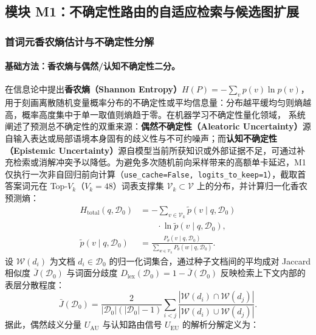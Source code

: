 \documentclass[11pt]{article}
\begin{document}
\subsection{模块 M1：不确定性路由的自适应检索与候选图扩展}

\subsubsection{首词元香农熵估计与不确定性分解}
\paragraph{基础方法：香农熵与偶然/认知不确定性二分。}
\citet{shannon1948mathematical} 在信息论中提出\textbf{香农熵（Shannon Entropy）}$H(P) = -\sum_v p(v)\ln p(v)$，用于刻画离散随机变量概率分布的不确定性或平均信息量：分布越平缓均匀则熵越高，概率高度集中于单一取值则熵趋于零。在机器学习不确定性量化领域，\citet{hullermeier2021aleatoric} 系统阐述了预测总不确定性的双重来源：\textbf{偶然不确定性（Aleatoric Uncertainty）}源自输入表达或局部语境本身固有的歧义性与不可约噪声；而\textbf{认知不确定性（Epistemic Uncertainty）}源自模型当前所获知识或外部证据不足，可通过补充检索或消解冲突予以降低。为避免多次随机前向采样带来的高额单卡延迟，M1 仅执行一次非自回归前向计算（\texttt{use\_cache=False, logits\_to\_keep=1}），截取首答案词元在 Top-$V_k$（$V_k = 48$）词表支撑集 $\mathcal{V}_k \subset \mathcal{V}$ 上的分布，并计算归一化香农预测熵：
\begin{align}
H_{\text{total}}(q, \mathcal{D}_0) &= -\sum_{v \in \mathcal{V}_k} \tilde{p}(v \mid q, \mathcal{D}_0) \nonumber \\
&\qquad \cdot \ln \tilde{p}(v \mid q, \mathcal{D}_0), \label{eq:zh_m1_htotal} \\
\tilde{p}(v \mid q, \mathcal{D}_0) &= \frac{P_{\theta}(v \mid q, \mathcal{D}_0)}{\sum_{w \in \mathcal{V}_k} P_{\theta}(w \mid q, \mathcal{D}_0)}. \nonumber
\end{align}
设 $\mathcal{W}(d_i)$ 为文档 $d_i \in \mathcal{D}_0$ 的归一化词集合，通过种子文档间的平均成对 Jaccard 相似度 $\bar{J}(\mathcal{D}_0)$ 与词面分歧度 $D_{\text{lex}}(\mathcal{D}_0) = 1 - \bar{J}(\mathcal{D}_0)$ 反映检索上下文内部的表层分散程度：
\begin{equation}
\bar{J}(\mathcal{D}_0) = \frac{2}{|\mathcal{D}_0|(|\mathcal{D}_0|-1)} \sum_{i < j} \frac{|\mathcal{W}(d_i) \cap \mathcal{W}(d_j)|}{|\mathcal{W}(d_i) \cup \mathcal{W}(d_j)|}.
\label{eq:zh_m1_jbar}
\end{equation}
据此，偶然歧义分量 $U_{\text{AU}}$ 与认知路由信号 $U_{\text{EU}}$ 的解析分解定义为：
\end{document}
